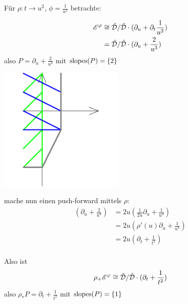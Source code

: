 \begin{exmp}\label{exmp:push-forward}
  Für $\rho:t\rightarrow u^2$, $\phi=\frac{1}{u^2}$ betrachte:\\
  \begin{minipage}[hbt]{0,39\textwidth}
    \begin{align*}
      \mathscr{E}^\varphi &\cong\hat{\mathcal{D}}/\hat{\mathcal{D}}\cdot(\partial_u+\partial_t\frac{1}{u^2})\\
               &= \hat{\mathcal{D}}/\hat{\mathcal{D}}\cdot (\partial_u+\frac{2}{u^3})
    \end{align*}
    also $P=\partial_u+\frac{2}{u^3}$
    mit $ \operatorname{slopes}(P)=\{2\} $
  \end{minipage}
  \begin{minipage}[hbt]{0,59\textwidth}
    \begin{center}
      \includegraphics[width=6cm]{img/pf-start.png}
    \end{center}
  \end{minipage}
  mache nun einen push-forward mittels $\rho$:
  \begin{align*}
    (\partial_u+\frac{2}{u^3}) &= 2u(\frac{1}{2u}\partial_u+\frac{1}{u^4}) \\
                               &= 2u(\rho'(u)\partial_u+\frac{1}{u^4}) \\
                               &= 2u(\partial_t+\frac{1}{t^2})\\
  \end{align*}
  \begin{minipage}[hbt]{0,39\textwidth}
    Also ist
    \begin{align*}
      \rho_+\mathscr{E}^\varphi\cong \hat{\mathcal{D}}/\hat{\mathcal{D}}\cdot(\partial_t+\frac{1}{t^2})
    \end{align*}
    also $\rho_*P=\partial_t+\frac{1}{t^2}$
    mit $ \operatorname{slopes}(P)=\{1\} $
  \end{minipage}
  \begin{minipage}[hbt]{0,59\textwidth}

\end{minipage}
\end{exmp}
